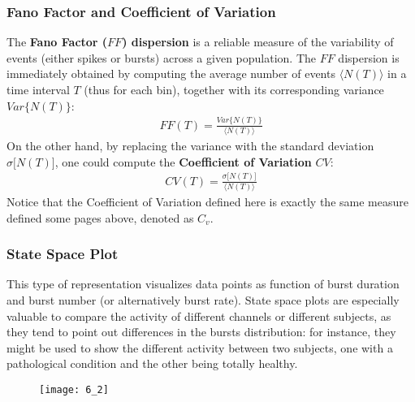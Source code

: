 \subsubsection{Fano Factor and Coefficient of Variation}
The \textbf{Fano Factor (\(FF\)) dispersion} is a reliable measure of the variability of events
(either spikes or bursts) across a given population. The \(FF\) dispersion is
immediately obtained by computing the average number of events \(\langle{N(T)}\rangle\)
in a time interval \(T\) (thus for each bin), together with its corresponding variance
\(Var\{N(T)\}\):
\begin{align*}
    FF(T)=\frac{Var\{N(T)\}}{\langle{N(T)}\rangle}
\end{align*}
On the other hand, by replacing the variance with the standard deviation
\(\sigma\bigl[N(T)\bigr]\), one could compute the \textbf{Coefficient of Variation}
\(CV\):
\begin{align*}
    CV(T)=\frac{\sigma\bigl[N(T)\bigr]}{\langle{N(T)}\rangle}
\end{align*}
Notice that the Coefficient of Variation defined here is exactly the same
measure defined some pages above, denoted as \(C_v\).

\subsubsection{State Space Plot}
This type of representation visualizes data points as function of burst duration
and burst number (or alternatively burst rate). State space plots are
especially valuable to compare the activity of different channels or different
subjects, as they tend to point out differences in the bursts distribution:
for instance, they might be used to show the different activity between two
subjects, one with a pathological condition and the other being totally healthy.
\begin{figure}[H]
    \texttt{[image: 6\_2]}
    \centering
\end{figure}
